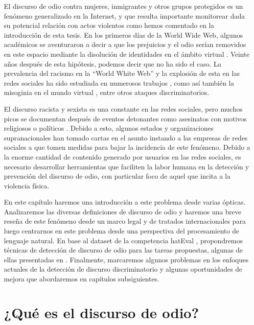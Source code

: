\label{chap:04_hate_speech}

El discurso de odio contra mujeres, inmigrantes y otros grupos protegidos es un fenómeno generalizado en la Internet, y que resulta importante monitorear dada su potencial relación con actos violentos como hemos comentado en la introducción de esta tesis. En los primeros días de la World Wide Web, algunos académicos se aventuraron a decir a que los prejuicios y el odio serían removidos en este espacio mediante la disolución de identidades en el ámbito virtual \cite{levy2001cyberculture, rheingold1993virtual,calderon2020topic}. Veinte años después de esta hipótesis, podemos decir que no ha sido el caso. La prevalencia del racismo en la ``World White Web''  y la explosión de esta en las redes sociales ha sido estudiada en numerosos trabajos \cite{adams2005white, kettrey2014staking}, como así también la misoginia en el mundo virtual \cite{filipovic2007blogging, mantilla2013gendertrolling}, entre otros ataques discriminatorios.

El discurso racista y sexista es una constante en las redes sociales, pero muchos picos se documentan después de eventos detonantes como asesinatos con motivos religiosos o políticos \cite{burnap2015cyber}. Debido a esto, algunos estados y organizaciones supranacionales han tomado cartas en el asunto instando a las empresas de redes sociales a que tomen medidas para bajar la incidencia de este fenómeno. Debido a la enorme cantidad de contenido generado por usuarios en las redes sociales, es necesario desarrollar herramientas que faciliten la labor humana en la detección y prevención del discurso de odio, con particular foco de aquel que incita a la violencia física.


En este capítulo haremos una introducción a este problema desde varias ópticas. Analizaremos las diversas definiciones de discurso de odio y haremos una breve reseña de este fenómeno desde un marco legal y de tratados internacionales para luego centrarnos en este problema desde una perspectiva del procesamiento de lenguaje natural. En base al dataset de la competencia hatEval \cite{hateval2019semeval}, propondremos técnicas de detección de discurso de odio para las tareas propuestas, algunas de ellas presentadas en \citet{atalaya_tass2018}. Finalmente, marcaremos algunos problemas en los enfoques actuales de la detección de discurso discriminatorio y algunas oportunidades de mejora que abordaremos en capítulos subsiguientes.


\section{¿Qué es el discurso de odio?}
\label{sec:hate_speech_definitions}


